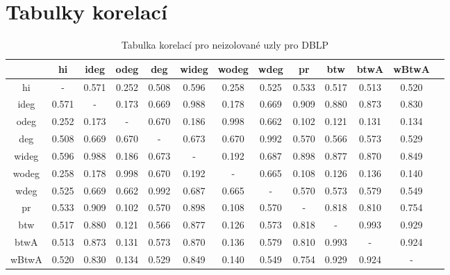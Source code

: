 \documentclass{bakalarka}
\begin{document}
\chapter{Tabulky korelací}
\begin{table}[!ht]
\centering
\caption{Tabulka korelací pro neizolované uzly pro DBLP}
\label{tab:corr1}
\begin{sideways}
\begin{tabular}{c|cccccccccccc}
\toprule
&hi  &ideg &odeg &deg  &wideg&wodeg&wdeg &pr   &btw  &btwA &wBtwA\\
\midrule
hi   &  -  &0.571&0.252&0.508&0.596&0.258&0.525&0.533&0.517&0.513&0.520\\
ideg &0.571&  -  &0.173&0.669&0.988&0.178&0.669&0.909&0.880&0.873&0.830\\
odeg &0.252&0.173&  -  &0.670&0.186&0.998&0.662&0.102&0.121&0.131&0.134\\
deg  &0.508&0.669&0.670&  -  &0.673&0.670&0.992&0.570&0.566&0.573&0.529\\
wideg&0.596&0.988&0.186&0.673&  -  &0.192&0.687&0.898&0.877&0.870&0.849\\
wodeg&0.258&0.178&0.998&0.670&0.192&  -  &0.665&0.108&0.126&0.136&0.140\\
wdeg &0.525&0.669&0.662&0.992&0.687&0.665&  -  &0.570&0.573&0.579&0.549\\
pr   &0.533&0.909&0.102&0.570&0.898&0.108&0.570&  -  &0.818&0.810&0.754\\
btw  &0.517&0.880&0.121&0.566&0.877&0.126&0.573&0.818&  -  &0.993&0.929\\
btwA &0.513&0.873&0.131&0.573&0.870&0.136&0.579&0.810&0.993&  -  &0.924\\
wBtwA&0.520&0.830&0.134&0.529&0.849&0.140&0.549&0.754&0.929&0.924&  -  \\
\bottomrule
\end{tabular}
\end{sideways}
\end{table}
\end{document}
